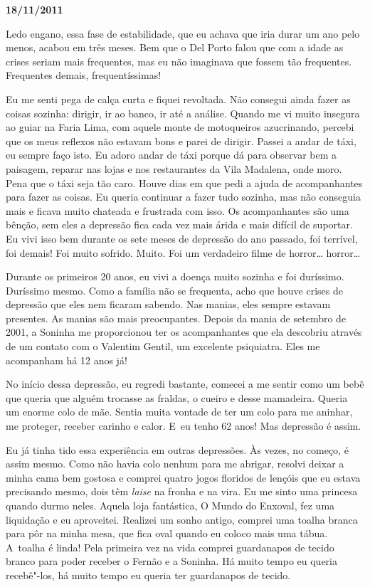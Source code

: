 \begin{center}\asterisc{}\end{center}


\begin{flushright}\textbf{18/11/2011}\end{flushright}


Ledo engano, essa fase de estabilidade, que eu achava que iria durar um
ano pelo menos, acabou em três meses. Bem que o Del Porto falou que com
a idade as crises seriam mais frequentes, mas eu não imaginava que
fossem tão frequentes. Frequentes demais, frequentíssimas!

Eu me senti pega de calça curta e fiquei revoltada. Não consegui ainda
fazer as coisas sozinha: dirigir, ir ao banco, ir até a análise. Quando
me vi muito insegura ao guiar na Faria Lima, com aquele monte de
motoqueiros azucrinando, percebi que os meus reflexos não estavam bons e
parei de dirigir. Passei a andar de táxi, eu sempre faço isto. Eu adoro
andar de táxi porque dá para observar bem a paisagem, reparar nas lojas
e nos restaurantes da Vila Madalena, onde moro. Pena que o táxi seja tão
caro. Houve dias em que pedi a ajuda de acompanhantes para fazer as
coisas. Eu queria continuar a fazer tudo sozinha, mas não conseguia mais
e ficava muito chateada e frustrada com isso. Os acompanhantes são uma
bênção, sem eles a depressão fica cada vez mais árida e mais difícil de
suportar. Eu vivi isso bem durante os sete meses de depressão do ano
passado, foi terrível, foi demais! Foi muito sofrido. Muito. Foi um
verdadeiro filme de horror… horror…

Durante os primeiros 20 anos, eu vivi a doença muito sozinha e foi
duríssimo. Duríssimo mesmo. Como a família não se frequenta, acho que
houve crises de depressão que eles nem ficaram sabendo. Nas manias, eles
sempre estavam presentes. As manias são mais preocupantes. Depois da
mania de setembro de 2001, a Soninha me proporcionou ter os
acompanhantes que ela descobriu através de um contato com o Valentim
Gentil, um excelente psiquiatra. Eles me acompanham há 12 anos já!

No início dessa depressão, eu regredi bastante, comecei a me sentir como
um bebê que queria que alguém trocasse as fraldas, o cueiro e desse
mamadeira. Queria um enorme colo de mãe. Sentia muita vontade de ter um
colo para me aninhar, me proteger, receber carinho e calor. E~eu tenho
62 anos! Mas depressão é assim.

Eu já tinha tido essa experiência em outras depressões. Às vezes, no
começo, é assim mesmo. Como não havia colo nenhum para me abrigar,
resolvi deixar a minha cama bem gostosa e comprei quatro jogos floridos
de lençóis que eu estava precisando mesmo, dois têm \emph{laise} na
fronha e na vira. Eu me sinto uma princesa quando durmo neles. Aquela
loja fantástica, O Mundo do Enxoval, fez uma liquidação e eu aproveitei.
Realizei um sonho antigo, comprei uma toalha branca para pôr na minha
mesa, que fica oval quando eu coloco mais uma tábua. A~toalha é linda!
Pela primeira vez na vida comprei guardanapos de tecido branco para
poder receber o Fernão e a Soninha. Há muito tempo eu queria recebê"-los,
há muito tempo eu queria ter guardanapos de tecido.

